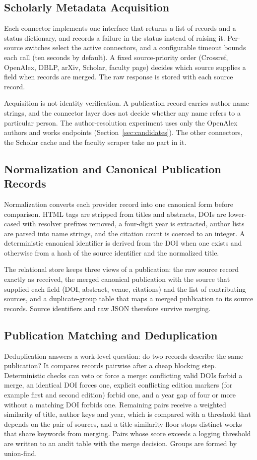 \subsection{Scholarly Metadata Acquisition}
Each connector implements one interface that returns a list of records and a status dictionary, and records a failure in the status instead of raising it. Per-source switches select the active connectors, and a configurable timeout bounds each call (ten seconds by default). A fixed source-priority order (Crossref, OpenAlex, DBLP, arXiv, Scholar, faculty page) decides which source supplies a field when records are merged. The raw response is stored with each source record.

Acquisition is not identity verification. A publication record carries author name strings, and the connector layer does not decide whether any name refers to a particular person. The author-resolution experiment uses only the OpenAlex authors and works endpoints (Section~\ref{sec:candidates}). The other connectors, the Scholar cache and the faculty scraper take no part in it.

\subsection{Normalization and Canonical Publication Records}
Normalization converts each provider record into one canonical form before comparison. HTML tags are stripped from titles and abstracts, DOIs are lower-cased with resolver prefixes removed, a four-digit year is extracted, author lists are parsed into name strings, and the citation count is coerced to an integer. A deterministic canonical identifier is derived from the DOI when one exists and otherwise from a hash of the source identifier and the normalized title.

The relational store keeps three views of a publication: the raw source record exactly as received, the merged canonical publication with the source that supplied each field (DOI, abstract, venue, citations) and the list of contributing sources, and a duplicate-group table that maps a merged publication to its source records. Source identifiers and raw JSON therefore survive merging.

\subsection{Publication Matching and Deduplication}
Deduplication answers a work-level question: do two records describe the same publication? It compares records pairwise after a cheap blocking step. Deterministic checks can veto or force a merge: conflicting valid DOIs forbid a merge, an identical DOI forces one, explicit conflicting edition markers (for example first and second edition) forbid one, and a year gap of four or more without a matching DOI forbids one. Remaining pairs receive a weighted similarity of title, author keys and year, which is compared with a threshold that depends on the pair of sources, and a title-similarity floor stops distinct works that share keywords from merging. Pairs whose score exceeds a logging threshold are written to an audit table with the merge decision. Groups are formed by union-find.

